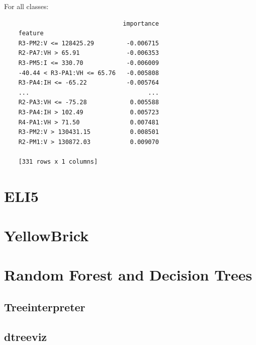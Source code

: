 For all classes:
\begin{verbatim}
                                 importance
    feature                                
    R3-PM2:V <= 128425.29         -0.006715
    R2-PA7:VH > 65.91             -0.006353
    R3-PM5:I <= 330.70            -0.006009
    -40.44 < R3-PA1:VH <= 65.76   -0.005808
    R3-PA4:IH <= -65.22           -0.005764
    ...                                 ...
    R2-PA3:VH <= -75.28            0.005588
    R3-PA4:IH > 102.49             0.005723
    R4-PA1:VH > 71.50              0.007481
    R3-PM2:V > 130431.15           0.008501
    R2-PM1:V > 130872.03           0.009070
    
    [331 rows x 1 columns]
\end{verbatim}
\section{ELI5}

\section{YellowBrick}

\section{Random Forest and Decision Trees}
\subsection{Treeinterpreter}

\subsection{dtreeviz}


